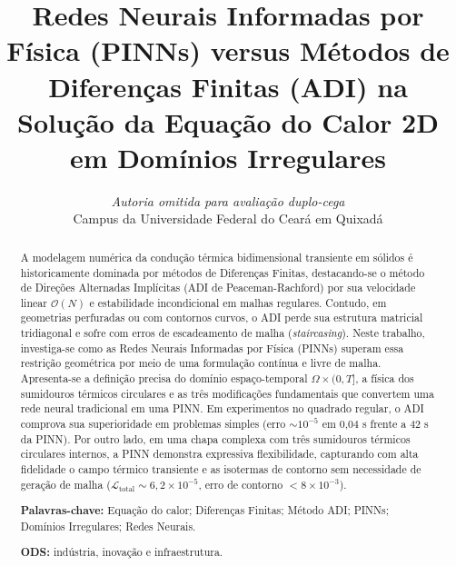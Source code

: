 \documentclass[11pt,a4paper]{article}
\title{\textbf{\large Redes Neurais Informadas por Física (PINNs) versus Métodos de Diferenças Finitas (ADI) na Solução da Equação do Calor 2D em Domínios Irregulares}}
\author{
  \normalsize\textit{Autoria omitida para avaliação duplo-cega}\\[0.2em]
  \small Campus da Universidade Federal do Ceará em Quixadá
}
\date{}
\begin{document}
\maketitle

\vspace{-1.5em}
\begin{abstract}
\noindent
A modelagem numérica da condução térmica bidimensional transiente em sólidos é historicamente dominada por métodos de Diferenças Finitas, destacando-se o método de Direções Alternadas Implícitas (ADI de Peaceman-Rachford) por sua velocidade linear $\mathcal{O}(N)$ e estabilidade incondicional em malhas regulares. Contudo, em geometrias perfuradas ou com contornos curvos, o ADI perde sua estrutura matricial tridiagonal e sofre com erros de escadeamento de malha (\textit{staircasing}). Neste trabalho, investiga-se como as Redes Neurais Informadas por Física (PINNs) superam essa restrição geométrica por meio de uma formulação contínua e livre de malha. Apresenta-se a definição precisa do domínio espaço-temporal $\Omega \times (0, T]$, a física dos sumidouros térmicos circulares e as três modificações fundamentais que convertem uma rede neural tradicional em uma PINN. Em experimentos no quadrado regular, o ADI comprova sua superioridade em problemas simples (erro $\sim 10^{-5}$ em 0,04 s frente a 42 s da PINN). Por outro lado, em uma chapa complexa com três sumidouros térmicos circulares internos, a PINN demonstra expressiva flexibilidade, capturando com alta fidelidade o campo térmico transiente e as isotermas de contorno sem necessidade de geração de malha ($\mathcal{L}_{\text{total}} \sim 6{,}2 \times 10^{-5}$, erro de contorno $< 8 \times 10^{-3}$).

\vspace{0.35em}
\noindent
\textbf{Palavras-chave:} Equação do calor; Diferenças Finitas; Método ADI; PINNs; Domínios Irregulares; Redes Neurais.

\vspace{0.2em}
\noindent
\textbf{ODS:} indústria, inovação e infraestrutura.
\end{abstract}
\end{document}
